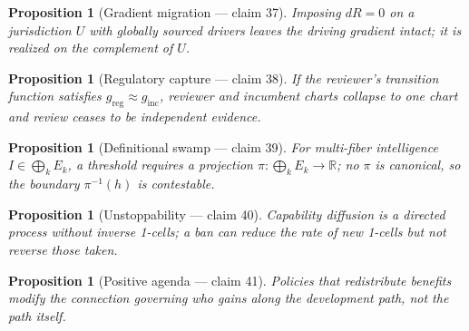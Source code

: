 \documentclass[11pt,a4paper]{article}
\newtheorem{proposition}[definition]{Proposition}
\begin{document}
\begin{proposition}[Gradient migration --- claim 37]
Imposing $dR=0$ on a jurisdiction $U$ with globally sourced drivers leaves the
driving gradient intact; it is realized on the complement of $U$.
\end{proposition}

\begin{proposition}[Regulatory capture --- claim 38]
If the reviewer's transition function satisfies $g_{\mathrm{reg}}\approx g_{\mathrm{inc}}$,
reviewer and incumbent charts collapse to one chart and review ceases to be
independent evidence.
\end{proposition}

\begin{proposition}[Definitional swamp --- claim 39]
For multi-fiber intelligence $I\in\bigoplus_k E_k$, a threshold requires a
projection $\pi:\bigoplus_k E_k\to\mathbb{R}$; no $\pi$ is canonical, so the
boundary $\pi^{-1}(h)$ is contestable.
\end{proposition}

\begin{proposition}[Unstoppability --- claim 40]
Capability diffusion is a directed process without inverse 1-cells; a ban can
reduce the rate of new 1-cells but not reverse those taken.
\end{proposition}

\begin{proposition}[Positive agenda --- claim 41]
Policies that redistribute benefits modify the connection governing who gains
along the development path, not the path itself.
\end{proposition}
\end{document}
